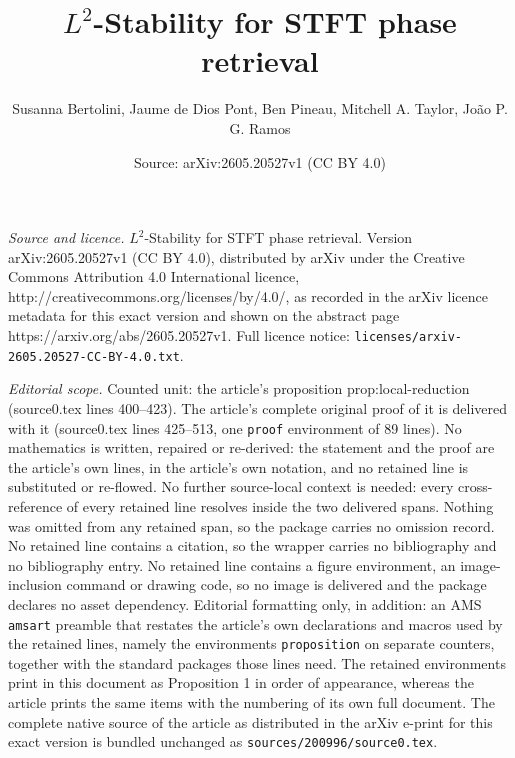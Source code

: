 \documentclass[10pt,a4paper]{amsart}
\title{$L^2$-Stability for STFT phase retrieval}
\author{Susanna Bertolini, Jaume de Dios Pont, Ben Pineau, Mitchell A. Taylor, Jo\~ao P. G. Ramos}
\date{Source: arXiv:2605.20527v1 (CC BY 4.0)}
\begin{document}
\maketitle

\noindent\emph{Source and licence.} $L^2$-Stability for STFT phase retrieval. Version arXiv:2605.20527v1 (CC BY 4.0), distributed by arXiv under the Creative Commons Attribution 4.0 International licence, http://creativecommons.org/licenses/by/4.0/, as recorded in the arXiv licence metadata for this exact version and shown on the abstract page https://arxiv.org/abs/2605.20527v1. Full licence notice: \texttt{licenses/arxiv-2605.20527-CC-BY-4.0.txt}.\par\smallskip

\noindent\textit{Editorial scope.} Counted unit: the article's proposition prop:local-reduction (source0.tex lines 400--423). The article's complete original proof of it is delivered with it (source0.tex lines 425--513, one \texttt{proof} environment of 89 lines). No mathematics is written, repaired or re-derived: the statement and the proof are the article's own lines, in the article's own notation, and no retained line is substituted or re-flowed.  No further source-local context is needed: every cross-reference of every retained line resolves inside the two delivered spans.  Nothing was omitted from any retained span, so the package carries no omission record.  No retained line contains a citation, so the wrapper carries no bibliography and no bibliography entry.  No retained line contains a figure environment, an image-inclusion command or drawing code, so no image is delivered and the package declares no asset dependency.  Editorial formatting only, in addition: an AMS \texttt{amsart} preamble that restates the article's own declarations and macros used by the retained lines, namely the environments \texttt{proposition} on separate counters, together with the standard packages those lines need.  The retained environments print in this document as Proposition 1 in order of appearance, whereas the article prints the same items with the numbering of its own full document.  The complete native source of the article as distributed in the arXiv e-print for this exact version is bundled unchanged as \texttt{sources/200996/source0.tex}.
\end{document}
